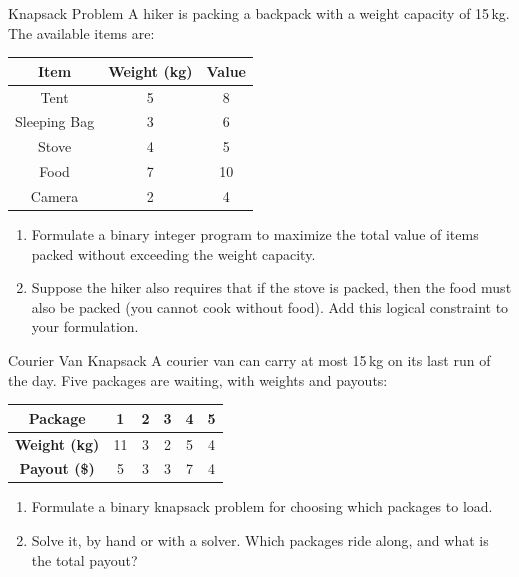 \begin{ex}{Knapsack Problem}{}
\label{ex:knapsack-hiker}
 A hiker is packing a backpack with a weight capacity of 15\,kg. The available items are:

\begin{center}
\begin{tabular}{c|c|c}
\textbf{Item} & \textbf{Weight (kg)} & \textbf{Value} \\
\hline
Tent & 5 & 8 \\
Sleeping Bag & 3 & 6 \\
Stove & 4 & 5 \\
Food & 7 & 10 \\
Camera & 2 & 4 \\
\end{tabular}
\par{}\label{tab:integerProgrammingFormulations-book1-tab02}%

\end{center}

\begin{enumerate}
\item Formulate a binary integer program to maximize the total value of items packed without exceeding the weight capacity.
\item Suppose the hiker also requires that if the stove is packed, then the food must also be packed (you cannot cook without food). Add this logical constraint to your formulation.
\end{enumerate}
\end{ex}

\begin{ex}{Courier Van Knapsack}{}
\label{ex:knapsack-warmup}
 A courier van can carry at most 15\,kg on its last run of the day.  Five packages are waiting, with weights and payouts:

\begin{center}
\begin{tabular}{c|c|c|c|c|c}
\textbf{Package} & 1 & 2 & 3 & 4 & 5 \\
\hline
\textbf{Weight (kg)} & 11 & 3 & 2 & 5 & 4 \\
\textbf{Payout (\$)} & 5 & 3 & 3 & 7 & 4 \\
\end{tabular}
\par{}\label{tab:integerProgrammingFormulations-book1-tab03}%

\end{center}

\begin{enumerate}
\item Formulate a binary knapsack problem for choosing which packages to load.
\item Solve it, by hand or with a solver.  Which packages ride along, and what is the total payout?
\end{enumerate}
\end{ex}

